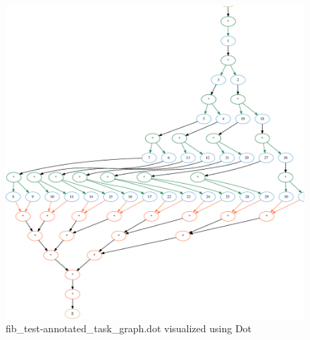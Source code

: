 \documentclass[11pt,a4paper,notitlepage]{article}
\begin{document}
\begin{figure}[!ht]
\centering
\includegraphics[width=\textwidth]{figures/fib_test-10_4-annotated_task_graph-dot.eps}
\caption{fib\_test-annotated\_task\_graph.dot visualized using Dot}
\label{fig:dot-atg}
\end{figure}
\end{document}
